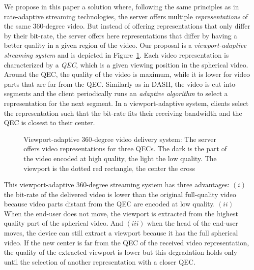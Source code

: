 We propose in this paper a solution where, following the same
principles as in rate-adaptive streaming technologies, the server
offers multiple \emph{representations} of the same $360$-degree video.
But instead of offering representations that only differ by their
bit-rate, the server offers here representations that differ by having
a better quality in a given region of the video. Our proposal is a
\emph{viewport-adaptive streaming system} and is depicted in
Figure~\ref{fig:deliverychain}. Each video representation is characterized
by a \emph{\ac{QEC}}, which is a given viewing position in the
spherical video. Around the \ac{QEC}, the quality of the video is
maximum, while it is lower for video parts that are far from the
\ac{QEC}. Similarly as in \ac{DASH}, the video is cut into segments
and the client periodically runs an \emph{adaptive algorithm} to
select a representation for the next segment. In a
viewport-adaptive system, clients select the representation
such that the bit-rate fits their receiving
bandwidth and the \ac{QEC} is closest to their \FoV{} center.

\begin{figure}
   \centering
   
   \caption{Viewport-adaptive 360-degree video delivery system: The server
   offers video representations for three \acp{QEC}. The dark  is the part of the video encoded at high quality, the light
    the low quality. The viewport is the dotted red rectangle, the \FoV{} center the
   cross}
   \label{fig:deliverychain}
\end{figure}

This viewport-adaptive $360$-degree streaming system has three
advantages: $(i)$ the bit-rate of the delivered video is lower than
the original full-quality video because video parts distant from the
\ac{QEC} are encoded at low quality. $(ii)$ When the end-user does not
move, the viewport is extracted from the highest quality part of the
spherical video. And $(iii)$ when the head of the end-user moves, the
device can still extract a viewport because it has the full
spherical video. If the new \FoV{} center is far from the \ac{QEC}
of the received video representation, the quality of the
extracted viewport is lower but this degradation holds only until the
selection of another representation with a closer \ac{QEC}.

